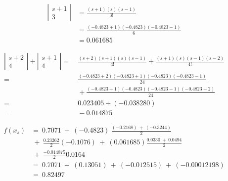 \begin{align*}
\left| \begin{array}{c} s + 1 \\ 3 \end{array} \right| &= \frac{(s+1)(s)(s-1)}{3!} \\
    &= \frac{(-0.4823 + 1)(-0.4823)(-0.4823 - 1)}{6} \\
    &= 0.061685
\end{align*}

\begin{align*}
\left| \begin{array}{c} s + 2 \\ 4 \end{array} \right| + \left| \begin{array}{c} s + 1 \\ 4 \end{array} \right| =&~ \frac{(s+2)(s+1)(s)(s-1)}{4!} + \frac{(s+1)(s)(s-1)(s-2)}{4!} \\
    =&~ \frac{(-0.4823+2)(-0.4823+1)(-0.4823)(-0.4823-1)}{24} \\
    &~+ \frac{(-0.4823+1)(-0.4823)(-0.4823-1)(-0.4823-2)}{24} \\
    =&~ 0.023405 + (-0.038280) \\
    =&~ -0.014875
\end{align*}

\begin{align*}
f(x_s) &=~ 0.7071 ~+~ (-0.4823) ~\frac{(-0.2168) ~+~ (-0.3244)}{2} \\
    &~+~ \frac{0.23262}{2} (-0.1076) ~+~ (0.061685) \frac{0.0330 ~+~ 0.0494}{2} \\
    &~+~ \frac{-0.014875}{2} 0.0164 \\
    &=~ 0.7071 ~+~ (0.13051) ~+~ (-0.012515) ~+~ (-0.00012198) \\
    &=~ 0.82497
\end{align*}